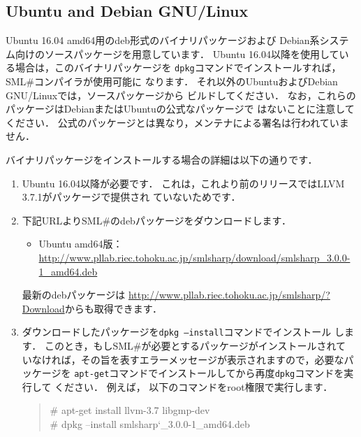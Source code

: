 \documentclass{jbook}
\newif\ifjp
\newcommand{\txt}[2]{#2}
\newcommand{\smlsharp}{SML\#}
\newcommand{\version}{3.0.0}
\newcommand\eurl[1]{{\edef\eurlTMP{{#1}}\expandafter\url\eurlTMP}}
\newenvironment{program}{\begin{quote}\begin{tt}}%
                        {\end{tt}\end{quote}}
\begin{document}
\fi%

\subsection{\txt{UbuntuおよびDebian GNU/Linux}{Ubuntu and Debian GNU/Linux}}
\ifjp%
	Ubuntu 16.04 amd64用のdeb形式のバイナリパッケージおよび
Debian系システム向けのソースパッケージを用意しています．
	Ubuntu 16.04以降を使用している場合は，このバイナリパッケージを
{\tt dpkg}コマンドでインストールすれば，\smlsharp{}コンパイラが使用可能に
なります．
	それ以外のUbuntuおよびDebian GNU/Linuxでは，ソースパッケージから
ビルドしてください．
	なお，これらのパッケージはDebianまたはUbuntuの公式なパッケージで
はないことに注意してください．
	公式のパッケージとは異なり，メンテナによる署名は行われていません．

	バイナリパッケージをインストールする場合の詳細は以下の通りです．
\begin{enumerate}
\item
	Ubuntu 16.04以降が必要です．
	これは，これより前のリリースではLLVM 3.7.1がパッケージで提供され
ていないためです．

\item
	下記URLより\smlsharp{}のdebパッケージをダウンロードします．
\begin{itemize}
\item Ubuntu amd64版：
\eurl{http://www.pllab.riec.tohoku.ac.jp/smlsharp/download/smlsharp_\version-1_amd64.deb}
\end{itemize}
	最新のdebパッケージは
\url{http://www.pllab.riec.tohoku.ac.jp/smlsharp/?Download}からも取得できます．
\item
	ダウンロードしたパッケージを{\tt dpkg --install}コマンドでインストール
します．
	このとき，もし\smlsharp{}が必要とするパッケージがインストールされて
いなければ，その旨を表すエラーメッセージが表示されますので，必要なパッケージを
{\tt apt-get}コマンドでインストールしてから再度{\tt dpkg}コマンドを実行して
ください．
	例えば，%
以下のコマンドをroot権限で実行します．
\begin{program}
\# apt-get install llvm-3.7 libgmp-dev\\
\# dpkg --install smlsharp\char`\_\version{}-1\_amd64.deb
\end{program}
\end{enumerate}
\end{document}
